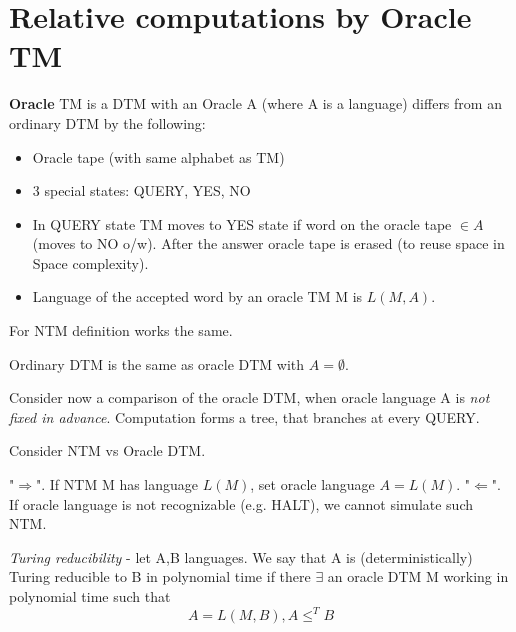 \section{\texorpdfstring{Relative computations by Oracle TM}{Relative computations by Oracle TM}}
\vspace{5mm}
\large


\begin{definition}[Oracle TM]
	\textbf{Oracle} TM is a DTM with an Oracle A (where A is a language) differs from an ordinary DTM by the following:
	\begin{itemize}
		\item Oracle tape (with same alphabet as TM)
		\item 3 special states: QUERY, YES, NO
		\item In QUERY state TM moves to YES state if word on the oracle tape $\in A$ (moves to NO o/w).
			After the answer oracle tape is erased (to reuse space in Space complexity).
		\item Language of the accepted word by an oracle TM M is $L(M, A)$.
	\end{itemize}
\end{definition}

\begin{note}
	For NTM definition works the same.
\end{note}

\begin{note}
	Ordinary DTM is the same as oracle DTM with $A = \emptyset$.
\end{note}

Consider now a comparison of the oracle DTM, when oracle language A is \emph{not fixed in advance}.
Computation forms a tree, that branches at every QUERY.

\begin{observation}
	Consider NTM vs Oracle DTM.

	"$\Rightarrow$". If NTM M has language $L(M)$, set oracle language $A = L(M)$.
	"$\Leftarrow$". If oracle language is not recognizable (e.g. HALT), we cannot simulate such NTM.
\end{observation}

\begin{definition}
	\emph{Turing reducibility} - let A,B languages.
	We say that A is (deterministically) Turing reducible to B in polynomial time if there $\exists$ an oracle DTM M working in polynomial time such that
	\[ A = L(M, B), A \leq^T B \]
\end{definition}

